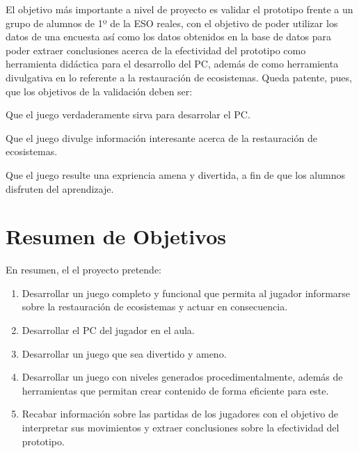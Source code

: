 El objetivo más importante a nivel de proyecto es validar el prototipo frente a un grupo de alumnos de 1º de la ESO reales, con el objetivo de poder utilizar los datos de una encuesta así como los datos obtenidos en la base de datos para poder extraer conclusiones acerca de la efectividad del prototipo como herramienta didáctica para el desarrollo del PC, además de como herramienta divulgativa en lo referente a la restauración de ecosistemas.
Queda patente, pues, que los objetivos de la validación deben ser:
\begin{compactitem}
    \item Que el juego verdaderamente sirva para desarrolar el PC.
    \item Que el juego divulge información interesante acerca de la restauración de ecosistemas.
    \item Que el juego resulte una expriencia amena y divertida, a fin de que los alumnos disfruten del aprendizaje.
\end{compactitem} 

\section{Resumen de Objetivos}

En resumen, el el proyecto pretende:
\begin{enumerate}
    \item Desarrollar un juego completo y funcional que permita al jugador informarse sobre la restauración de ecosistemas y actuar en consecuencia.
    \item Desarrollar el PC del jugador en el aula.
    \item Desarrollar un juego que sea divertido y ameno.
    \item Desarrollar un juego con niveles generados procedimentalmente, además de herramientas que permitan crear contenido de forma eficiente para este.
    \item Recabar información sobre las partidas de los jugadores con el objetivo de interpretar sus movimientos y extraer conclusiones sobre la efectividad del prototipo.
\end{enumerate}